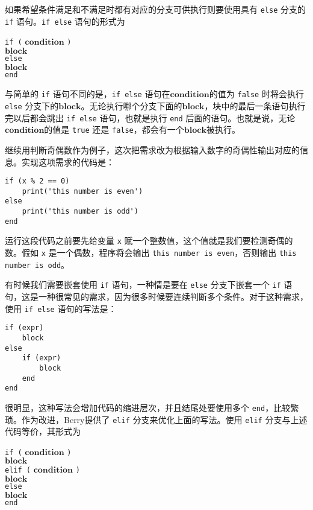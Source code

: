 如果希望条件满足和不满足时都有对应的分支可供执行则要使用具有 \texttt{else} 分支的 \texttt{if} 语句。\texttt{if else} 语句的形式为
\begin{algorithm}
    \texttt{if (} $\bm{condition}$ \texttt{)} \\
        \qquad $\bm{block}$ \\
    \texttt{else} \\
        \qquad $\bm{block}$ \\
    \texttt{end}
\end{algorithm}\vspace{-0.6em}
与简单的 \texttt{if} 语句不同的是，\texttt{if else} 语句在$\bm{condition}$的值为 \texttt{false} 时将会执行 \texttt{else} 分支下的$\bm{block}$。无论执行哪个分支下面的$\bm{block}$，块中的最后一条语句执行完以后都会跳出 \texttt{if else} 语句，也就是执行 \texttt{end} 后面的语句。也就是说，无论$\bm{condition}$的值是 \texttt{true} 还是 \texttt{false}，都会有一个$\bm{block}$被执行。

继续用判断奇偶数作为例子，这次把需求改为根据输入数字的奇偶性输出对应的信息。实现这项需求的代码是：
\begin{lstlisting}[language=berry, numbers=none]
if (x % 2 == 0)
    print('this number is even')
else
    print('this number is odd')
end
\end{lstlisting}
运行这段代码之前要先给变量 \texttt{x} 赋一个整数值，这个值就是我们要检测奇偶的数。假如 \texttt{x} 是一个偶数，程序将会输出 \texttt{this number is even}，否则输出 \texttt{this number is odd}。

有时候我们需要嵌套使用 \texttt{if} 语句，一种情是要在 \texttt{else} 分支下嵌套一个 \texttt{if} 语句，这是一种很常见的需求，因为很多时候要连续判断多个条件。对于这种需求，使用 \texttt{if else} 语句的写法是：
\begin{lstlisting}[language=berry, numbers=none]
if (expr)
    block
else
    if (expr)
        block
    end
end
\end{lstlisting}
很明显，这种写法会增加代码的缩进层次，并且结尾处要使用多个 \texttt{end}，比较繁琐。作为改进，Berry提供了 \texttt{elif} 分支来优化上面的写法。使用 \texttt{elif} 分支与上述代码等价，其形式为
\begin{algorithm}
    \texttt{if (} $\bm{condition}$ \texttt{)} \\
        \qquad $\bm{block}$ \\
    \texttt{elif (} $\bm{condition}$ \texttt{)} \\
        \qquad $\bm{block}$ \\
    \texttt{else} \\
    \qquad $\bm{block}$ \\
    \texttt{end}
\end{algorithm}\vspace{-0.6em}

